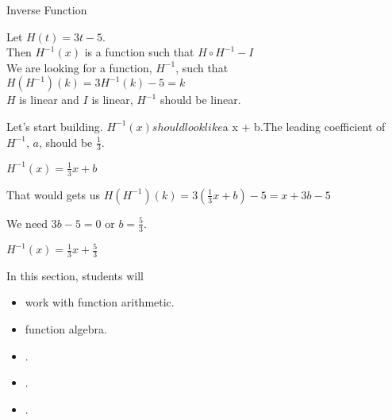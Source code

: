 \documentclass{ximera}
\begin{document}
\begin{example} Inverse Function


Let $H(t) = 3t - 5$. \\

Then $H^{-1}(x)$ is a function such that $H \circ H^{-1} - I$ \\


We are looking for a function, $H^{-1}$, such that $H(H^{-1})(k) = 3 H^{-1}(k) - 5 = k$ \\



$H$ is linear and $I$ is linear, $H^{-1}$ should be linear.

Let's start building.  $H^{-1}(x) should look like $a \cdot x + b$.  $The leading coefficient of $H^{-1}$, $a$, should be $\frac{1}{3}$.


$H^{-1}(x) =\frac{1}{3} x + b$


That would gets us $H(H^{-1})(k) = 3 (\frac{1}{3}x + b) - 5 = x + 3b - 5 $


We need $3b - 5 = 0$ or $b = \frac{5}{3}$.


$H^{-1}(x) =\frac{1}{3} x + \frac{5}{3}$



\end{example}






























\begin{sectionOutcomes}
In this section, students will 

\begin{itemize}
\item work with function arithmetic.
\item function algebra.
\item .
\item .
\item .
\end{itemize}
\end{sectionOutcomes}
\end{document}

